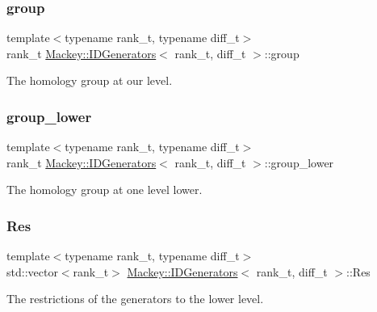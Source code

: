 \subsubsection{\texorpdfstring{group}{group}}
{\footnotesize\ttfamily template$<$typename rank\+\_\+t, typename diff\+\_\+t$>$ \\
rank\+\_\+t \hyperlink{classMackey_1_1IDGenerators}{Mackey\+::\+I\+D\+Generators}$<$ rank\+\_\+t, diff\+\_\+t $>$\+::group}



The homology group at our level. 

\mbox{\label{classMackey_1_1IDGenerators_a6eb50f39a23356d50461163e578e23a4}} 
\subsubsection{\texorpdfstring{group\+\_\+lower}{group\_lower}}
{\footnotesize\ttfamily template$<$typename rank\+\_\+t, typename diff\+\_\+t$>$ \\
rank\+\_\+t \hyperlink{classMackey_1_1IDGenerators}{Mackey\+::\+I\+D\+Generators}$<$ rank\+\_\+t, diff\+\_\+t $>$\+::group\+\_\+lower}



The homology group at one level lower. 

\mbox{\label{classMackey_1_1IDGenerators_a10ddb834467f6b1471375542a73d8e6f}} 
\subsubsection{\texorpdfstring{Res}{Res}}
{\footnotesize\ttfamily template$<$typename rank\+\_\+t, typename diff\+\_\+t$>$ \\
std\+::vector$<$rank\+\_\+t$>$ \hyperlink{classMackey_1_1IDGenerators}{Mackey\+::\+I\+D\+Generators}$<$ rank\+\_\+t, diff\+\_\+t $>$\+::Res}



The restrictions of the generators to the lower level. 

\mbox{\label{classMackey_1_1IDGenerators_a5dd4d24cfe493da4522198f03d32f078}} 
